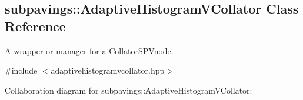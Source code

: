 \hypertarget{classsubpavings_1_1AdaptiveHistogramVCollator}{\subsection{subpavings\-:\-:\-Adaptive\-Histogram\-V\-Collator \-Class \-Reference}
\label{classsubpavings_1_1AdaptiveHistogramVCollator}
}


\-A wrapper or manager for a \hyperlink{classsubpavings_1_1CollatorSPVnode}{\-Collator\-S\-P\-Vnode}.  




{\ttfamily \#include $<$adaptivehistogramvcollator.\-hpp$>$}



\-Collaboration diagram for subpavings\-:\-:\-Adaptive\-Histogram\-V\-Collator\-:
